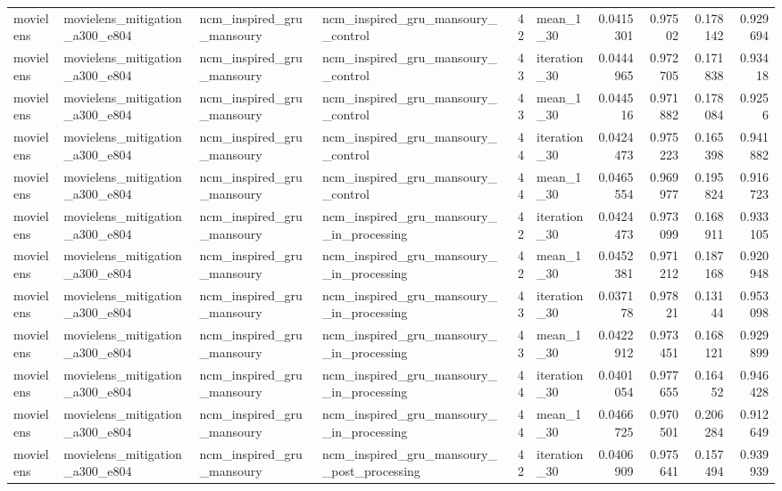 \begin{table}[htbp!]
\begin{tabular}{llllrlrrrr}
movielens & movielens\_mitigation\_a300\_e804 & ncm\_inspired\_gru\_mansoury & ncm\_inspired\_gru\_mansoury\_\_control & 42 & mean\_1\_30 & 0.0415301 & 0.97502 & 0.178142 & 0.929694 \\
movielens & movielens\_mitigation\_a300\_e804 & ncm\_inspired\_gru\_mansoury & ncm\_inspired\_gru\_mansoury\_\_control & 43 & iteration\_30 & 0.0444965 & 0.972705 & 0.171838 & 0.93418 \\
movielens & movielens\_mitigation\_a300\_e804 & ncm\_inspired\_gru\_mansoury & ncm\_inspired\_gru\_mansoury\_\_control & 43 & mean\_1\_30 & 0.044516 & 0.971882 & 0.178084 & 0.9256 \\
movielens & movielens\_mitigation\_a300\_e804 & ncm\_inspired\_gru\_mansoury & ncm\_inspired\_gru\_mansoury\_\_control & 44 & iteration\_30 & 0.0424473 & 0.975223 & 0.165398 & 0.941882 \\
movielens & movielens\_mitigation\_a300\_e804 & ncm\_inspired\_gru\_mansoury & ncm\_inspired\_gru\_mansoury\_\_control & 44 & mean\_1\_30 & 0.0465554 & 0.969977 & 0.195824 & 0.916723 \\
movielens & movielens\_mitigation\_a300\_e804 & ncm\_inspired\_gru\_mansoury & ncm\_inspired\_gru\_mansoury\_\_in\_processing & 42 & iteration\_30 & 0.0424473 & 0.973099 & 0.168911 & 0.933105 \\
movielens & movielens\_mitigation\_a300\_e804 & ncm\_inspired\_gru\_mansoury & ncm\_inspired\_gru\_mansoury\_\_in\_processing & 42 & mean\_1\_30 & 0.0452381 & 0.971212 & 0.187168 & 0.920948 \\
movielens & movielens\_mitigation\_a300\_e804 & ncm\_inspired\_gru\_mansoury & ncm\_inspired\_gru\_mansoury\_\_in\_processing & 43 & iteration\_30 & 0.037178 & 0.97821 & 0.13144 & 0.953098 \\
movielens & movielens\_mitigation\_a300\_e804 & ncm\_inspired\_gru\_mansoury & ncm\_inspired\_gru\_mansoury\_\_in\_processing & 43 & mean\_1\_30 & 0.0422912 & 0.973451 & 0.168121 & 0.929899 \\
movielens & movielens\_mitigation\_a300\_e804 & ncm\_inspired\_gru\_mansoury & ncm\_inspired\_gru\_mansoury\_\_in\_processing & 44 & iteration\_30 & 0.0401054 & 0.977655 & 0.16452 & 0.946428 \\
movielens & movielens\_mitigation\_a300\_e804 & ncm\_inspired\_gru\_mansoury & ncm\_inspired\_gru\_mansoury\_\_in\_processing & 44 & mean\_1\_30 & 0.0466725 & 0.970501 & 0.206284 & 0.912649 \\
movielens & movielens\_mitigation\_a300\_e804 & ncm\_inspired\_gru\_mansoury & ncm\_inspired\_gru\_mansoury\_\_post\_processing & 42 & iteration\_30 & 0.0406909 & 0.975641 & 0.157494 & 0.939939 \\

\end{tabular}
\end{table}
